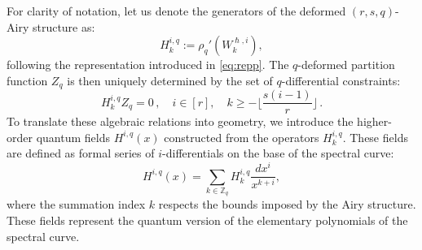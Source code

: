 \documentclass[reqno,11pt]{amsart}
\theoremstyle{plain}
\theoremstyle{definition}
\theoremstyle{remark}
\numberwithin{equation}{section}
\newcommand{\mb}[1]{\mathbb{#1}}
\newcommand{\1}{\mathds{1}}
\newcommand{\Z}{\mb{Z}}
\newcommand{\2}{\frac{1}{2}}
\begin{document}
{								For clarity of notation, let us denote the generators of the deformed $(r,s,q)$-Airy structure as:
								\begin{equation}\label{eq:unshiftedH}
									H^{i,q}_k := \rho_q'( W^{\hslash,i}_k), 
								\end{equation}
								following the representation introduced in \eqref{eq:repp}. The $q$-deformed partition function $Z_q$ is then uniquely determined by the set of $q$-differential constraints:
								\begin{equation}
									H^{i,q}_k Z_q = 0 \,, \quad i \in [r], \quad k \geq - \lfloor \frac{s(i-1)}{r} \rfloor\,.
								\end{equation}
								To translate these algebraic relations into geometry, we introduce the higher-order quantum fields $H^{i,q}(x)$ constructed from the operators $H^{i,q}_k$. These fields are defined as formal series of $i$-differentials on the base of the spectral curve:
								\begin{equation}
									H^{i,q}(x)
									=
									\sum_{k \in \Z_q} H^{i,q}_k \frac{dx^i}{x^{k+i}},
								\end{equation}
								where the summation index $k$ respects the bounds imposed by the Airy structure. These fields represent the quantum version of the elementary polynomials of the spectral curve.
								
}
\end{document}
